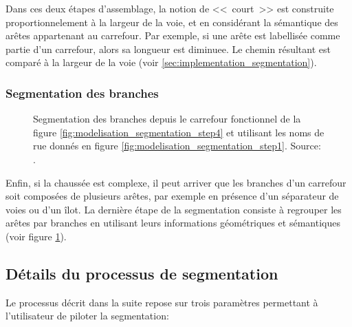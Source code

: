 \newpar{}

Dans ces deux étapes d'assemblage, la notion de <<~court~>> est construite proportionnelement à la largeur de la voie, et en considérant la sémantique des arêtes appartenant au carrefour. Par exemple, si une arête est labellisée comme partie d'un carrefour, alors sa longueur est diminuee. Le chemin résultant est comparé à la largeur de la voie (voir \ref{sec:implementation_segmentation}).

\subsubsection{Segmentation des branches}

\begin{figure}[ht]
    \centering
    \caption[Segmentation des branches d'un carrefour]{Segmentation des branches depuis le carrefour fonctionnel de la figure \ref{fig:modelisation_segmentation_step4} et utilisant les noms de rue donnés en figure {\ref{fig:modelisation_segmentation_step1}}. Source: \citep{Favreau2022}.}
    \label{fig:modelisation_segmentation_step5}
\end{figure}

Enfin, si la chaussée est complexe, il peut arriver que les branches d'un carrefour soit composées de plusieurs arêtes, par exemple en présence d'un séparateur de voies ou d'un îlot. La dernière étape de la segmentation consiste à regrouper les arêtes par branches en utilisant leurs informations géométriques et sémantiques (voir figure \ref{fig:modelisation_segmentation_step5}).

\subsection{Détails du processus de segmentation}

Le processus décrit dans la suite repose sur trois paramètres permettant à l'utilisateur de piloter la segmentation:

